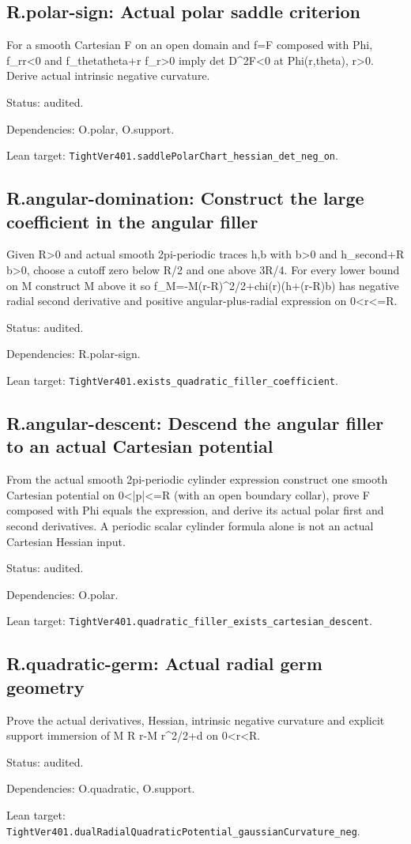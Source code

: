 \documentclass{article}
\begin{document}
\subsection*{R.polar-sign: Actual polar saddle criterion}
For a smooth Cartesian F on an open domain and f=F composed with Phi, f\_rr<0 and f\_thetatheta+r f\_r>0 imply det D^2F<0 at Phi(r,theta), r>0. Derive actual intrinsic negative curvature.
\par Status: audited.
\par Dependencies: O.polar, O.support.
\par Lean target: \texttt{TightVer401.saddlePolarChart\_hessian\_det\_neg\_on}.
\subsection*{R.angular-domination: Construct the large coefficient in the angular filler}
Given R>0 and actual smooth 2pi-periodic traces h,b with b>0 and h\_second+R b>0, choose a cutoff zero below R/2 and one above 3R/4. For every lower bound on M construct M above it so f\_M=-M(r-R)^2/2+chi(r)(h+(r-R)b) has negative radial second derivative and positive angular-plus-radial expression on 0<r<=R.
\par Status: audited.
\par Dependencies: R.polar-sign.
\par Lean target: \texttt{TightVer401.exists\_quadratic\_filler\_coefficient}.
\subsection*{R.angular-descent: Descend the angular filler to an actual Cartesian potential}
From the actual smooth 2pi-periodic cylinder expression construct one smooth Cartesian potential on 0<|p|<=R (with an open boundary collar), prove F composed with Phi equals the expression, and derive its actual polar first and second derivatives. A periodic scalar cylinder formula alone is not an actual Cartesian Hessian input.
\par Status: audited.
\par Dependencies: O.polar.
\par Lean target: \texttt{TightVer401.quadratic\_filler\_exists\_cartesian\_descent}.
\subsection*{R.quadratic-germ: Actual radial germ geometry}
Prove the actual derivatives, Hessian, intrinsic negative curvature and explicit support immersion of M R r-M r^2/2+d on 0<r<R.
\par Status: audited.
\par Dependencies: O.quadratic, O.support.
\par Lean target: \texttt{TightVer401.dualRadialQuadraticPotential\_gaussianCurvature\_neg}.
\end{document}

